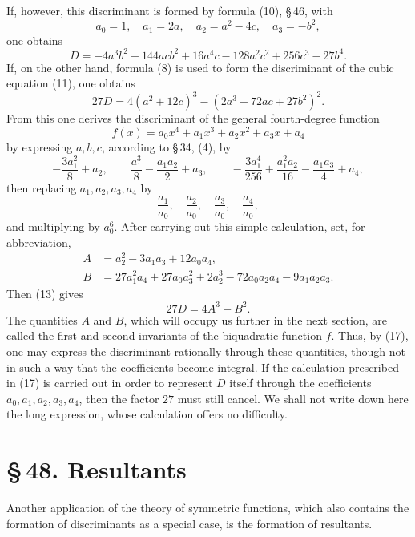 \documentclass[11pt]{article}
\providecommand{\sect}[2]{\section*{\S\,#1. #2}}
\begin{document}
If, however, this discriminant is formed by formula (10), \S\,46, with
\[
 a_0=1,\quad a_1=2a,\quad a_2=a^2-4c,\quad a_3=-b^2,
\]
one obtains
\begin{equation}
D=-4a^3b^2+144acb^2+16a^4c-128a^2c^2+256c^3-27b^4.
\tag{12}
\end{equation}
If, on the other hand, formula (8) is used to form the discriminant of the cubic equation (11), one obtains
\begin{equation}
27D=4(a^2+12c)^3-(2a^3-72ac+27b^2)^2.
\tag{13}
\end{equation}
From this one derives the discriminant of the general fourth-degree function
\begin{equation}
f(x)=a_0x^4+a_1x^3+a_2x^2+a_3x+a_4
\tag{14}
\end{equation}
by expressing $a,b,c$, according to \S\,34, (4), by
\[
 -\frac{3a_1^2}{8}+a_2,
 \qquad
 \frac{a_1^3}{8}-\frac{a_1a_2}{2}+a_3,
 \qquad
 -\frac{3a_1^4}{256}+\frac{a_1^2a_2}{16}-\frac{a_1a_3}{4}+a_4,
\]
then replacing $a_1,a_2,a_3,a_4$ by
\[
\frac{a_1}{a_0},\quad \frac{a_2}{a_0},\quad \frac{a_3}{a_0},\quad \frac{a_4}{a_0},
\]
and multiplying by $a_0^6$. After carrying out this simple calculation, set, for abbreviation,
\begin{align}
A&=a_2^2-3a_1a_3+12a_0a_4,
\tag{15}\\
B&=27a_1^2a_4+27a_0a_3^2+2a_2^3-72a_0a_2a_4-9a_1a_2a_3.
\tag{16}
\end{align}
Then (13) gives
\begin{equation}
27D=4A^3-B^2.
\tag{17}
\end{equation}
The quantities $A$ and $B$, which will occupy us further in the next section, are called the first and second invariants of the biquadratic function $f$. Thus, by (17), one may express the discriminant rationally through these quantities, though not in such a way that the coefficients become integral. If the calculation prescribed in (17) is carried out in order to represent $D$ itself through the coefficients $a_0,a_1,a_2,a_3,a_4$, then the factor $27$ must still cancel. We shall not write down here the long expression, whose calculation offers no difficulty.

\sect{48}{Resultants}

Another application of the theory of symmetric functions, which also contains the formation of discriminants as a special case, is the formation of resultants.
\end{document}
